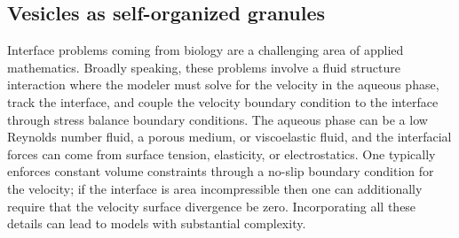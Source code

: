 \subsection{Vesicles as self-organized granules}
Interface problems coming from biology are a challenging
area of applied mathematics.  Broadly speaking, these problems
involve a fluid structure interaction where the modeler must
solve for the velocity in the aqueous phase, track the interface,
and couple the velocity boundary condition to the interface through
stress balance boundary conditions.  The aqueous phase can
be a low Reynolds number fluid, a porous medium, or viscoelastic fluid,
and the interfacial forces can come from surface tension, elasticity,
or electrostatics.
One typically enforces constant volume constraints through a no-slip
boundary condition for the velocity; if the interface is area incompressible
then one can additionally require that the velocity surface divergence
be zero.  Incorporating all these details can lead to models with substantial
complexity.

